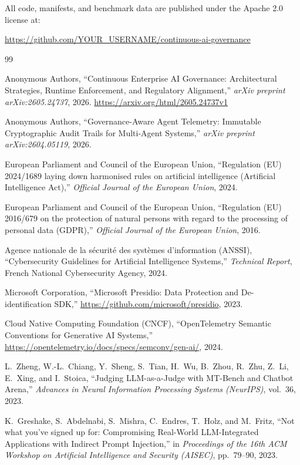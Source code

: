 \documentclass[11pt,a4paper]{article}
\theoremstyle{definition}
\begin{document}
All code, manifests, and benchmark data are published under the Apache 2.0 license at:
\begin{center}
\url{https://github.com/YOUR_USERNAME/continuous-ai-governance}
\end{center}


\begin{thebibliography}{99}

Anonymous Authors, ``Continuous Enterprise AI Governance: Architectural Strategies, Runtime Enforcement, and Regulatory Alignment,'' \textit{arXiv preprint arXiv:2605.24737}, 2026. \url{https://arxiv.org/html/2605.24737v1}

Anonymous Authors, ``Governance-Aware Agent Telemetry: Immutable Cryptographic Audit Trails for Multi-Agent Systems,'' \textit{arXiv preprint arXiv:2604.05119}, 2026.

European Parliament and Council of the European Union, ``Regulation (EU) 2024/1689 laying down harmonised rules on artificial intelligence (Artificial Intelligence Act),'' \textit{Official Journal of the European Union}, 2024.

European Parliament and Council of the European Union, ``Regulation (EU) 2016/679 on the protection of natural persons with regard to the processing of personal data (GDPR),'' \textit{Official Journal of the European Union}, 2016.

Agence nationale de la s{\'e}curit{\'e} des syst{\`e}mes d'information (ANSSI), ``Cybersecurity Guidelines for Artificial Intelligence Systems,'' \textit{Technical Report}, French National Cybersecurity Agency, 2024.

Microsoft Corporation, ``Microsoft Presidio: Data Protection and De-identification SDK,'' \url{https://github.com/microsoft/presidio}, 2023.

Cloud Native Computing Foundation (CNCF), ``OpenTelemetry Semantic Conventions for Generative AI Systems,'' \url{https://opentelemetry.io/docs/specs/semconv/gen-ai/}, 2024.

L.~Zheng, W.-L.~Chiang, Y.~Sheng, S.~Tian, H.~Wu, B.~Zhou, R.~Zhu, Z.~Li, E.~Xing, and I.~Stoica, ``Judging LLM-as-a-Judge with MT-Bench and Chatbot Arena,'' \textit{Advances in Neural Information Processing Systems (NeurIPS)}, vol.~36, 2023.

K.~Greshake, S.~Abdelnabi, S.~Mishra, C.~Endres, T.~Holz, and M.~Fritz, ``Not what you've signed up for: Compromising Real-World LLM-Integrated Applications with Indirect Prompt Injection,'' in \textit{Proceedings of the 16th ACM Workshop on Artificial Intelligence and Security (AISEC)}, pp.~79--90, 2023.


\end{thebibliography}
\end{document}
